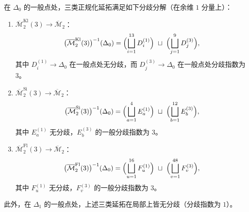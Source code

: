 \begin{theorem}\label{thm:conclusion-m2-level3-delta0-ramification-splitting}
在 \(\Delta_0\) 的一般点处，三类正规化延拓满足如下分歧分解（在余维 \(1\) 分量上）：
\begin{enumerate}
  \item \(\overline{\mathcal M}_2^{\mathrm{Kl}}(3)\to \overline{\mathcal M}_2\)：
  \[
  \bigl(\overline{\mathcal M}_2^{\mathrm{Kl}}(3)\bigr)^{-1}(\Delta_0)
  =\Bigl(\bigsqcup_{i=1}^{13}D_i^{(1)}\Bigr)\ \sqcup\ \Bigl(\bigsqcup_{j=1}^{9}D_j^{(3)}\Bigr),
  \]
  其中 \(D_i^{(1)}\to \Delta_0\) 在一般点处无分歧，而 \(D_j^{(3)}\to \Delta_0\) 在一般点处分歧指数为 \(3\)。
  \item \(\overline{\mathcal M}_2^{\mathrm{Si}}(3)\to \overline{\mathcal M}_2\)：
  \[
  \bigl(\overline{\mathcal M}_2^{\mathrm{Si}}(3)\bigr)^{-1}(\Delta_0)
  =\Bigl(\bigsqcup_{a=1}^{4}E_a^{(1)}\Bigr)\ \sqcup\ \Bigl(\bigsqcup_{b=1}^{12}E_b^{(3)}\Bigr),
  \]
  其中 \(E_a^{(1)}\) 无分歧，\(E_b^{(3)}\) 的一般分歧指数为 \(3\)。
  \item \(\overline{\mathcal M}_2^{\mathrm{Fl}}(3)\to \overline{\mathcal M}_2\)：
  \[
  \bigl(\overline{\mathcal M}_2^{\mathrm{Fl}}(3)\bigr)^{-1}(\Delta_0)
  =\Bigl(\bigsqcup_{u=1}^{16}F_u^{(1)}\Bigr)\ \sqcup\ \Bigl(\bigsqcup_{v=1}^{48}F_v^{(3)}\Bigr),
  \]
  其中 \(F_u^{(1)}\) 无分歧，\(F_v^{(3)}\) 的一般分歧指数为 \(3\)。
\end{enumerate}
此外，在 \(\Delta_1\) 的一般点处，上述三类延拓在局部上皆无分歧（分歧指数为 \(1\)）。
\end{theorem}
